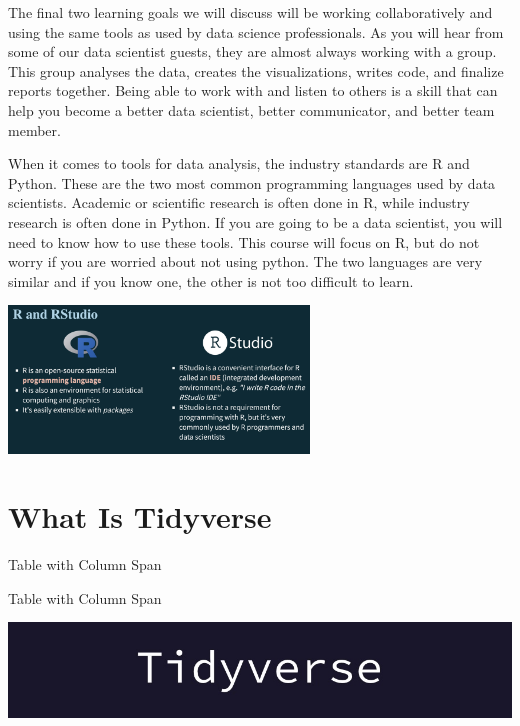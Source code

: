 \documentclass[
  letterpaper,
  DIV=11,
  numbers=noendperiod]{scrreprt}
\begin{document}
The final two learning goals we will discuss will be working
collaboratively and using the same tools as used by data science
professionals. As you will hear from some of our data scientist guests,
they are almost always working with a group. This group analyses the
data, creates the visualizations, writes code, and finalize reports
together. Being able to work with and listen to others is a skill that
can help you become a better data scientist, better communicator, and
better team member.

When it comes to tools for data analysis, the industry standards are R
and Python. These are the two most common programming languages used by
data scientists. Academic or scientific research is often done in R,
while industry research is often done in Python. If you are going to be
a data scientist, you will need to know how to use these tools. This
course will focus on R, but do not worry if you are worried about not
using python. The two languages are very similar and if you know one,
the other is not too difficult to learn.

\includegraphics[width=0.6\textwidth,height=\textheight]{./images/WIDS-13.jpg}


\chapter*{What Is Tidyverse}\label{what-is-tidyverse}


Table with Column Span

Table with Column Span

\includegraphics[width=1\textwidth,height=\textheight]{./images/WIT_2.jpg}
\end{document}
